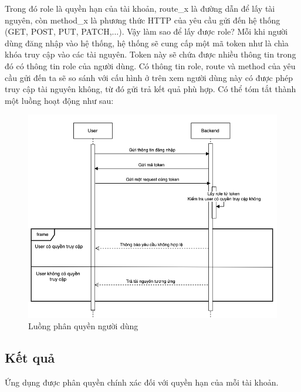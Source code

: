 \documentclass[../DoAn.tex]{subfiles}
\begin{document}
Trong đó role là quyền hạn của tài khoản, route\_x là đường dẫn để lấy tài nguyên, còn method\_x là phương thức HTTP của yêu cầu gửi đến hệ thống (GET, POST, PUT, PATCH,...). Vậy làm sao để lấy được role? Mỗi khi người dùng đăng nhập vào hệ thống, hệ thống sẽ cung cấp một mã token như là chìa khóa truy cập vào các tài nguyên. Token này sẽ chứa được nhiều thông tin trong đó có thông tin role của người dùng. Có thông tin role, route và method của yêu cầu gửi đến ta sẽ so sánh với cấu hình ở trên xem người dùng này có được phép truy cập tài nguyên không, từ đó gửi trả kết quả phù hợp. Có thể tóm tắt thành một luồng hoạt động như sau:

\begin{figure}[H]
    \centering
    \includegraphics[width=0.9\linewidth]{Hinhve/PhanQuyenNguoiDung.png}
    \caption{Luồng phân quyền người dùng}
\end{figure}

\subsection{Kết quả}
Ứng dụng được phân quyền chính xác đối với quyền hạn của mỗi tài khoản.
\end{document}
